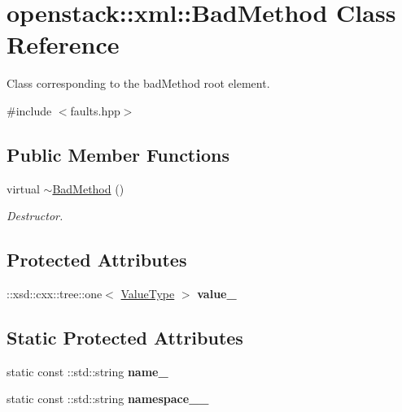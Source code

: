 \hypertarget{classopenstack_1_1xml_1_1BadMethod}{
\section{openstack::xml::BadMethod Class Reference}
\label{classopenstack_1_1xml_1_1BadMethod}
}


Class corresponding to the badMethod root element.  




{\ttfamily \#include $<$faults.hpp$>$}

\subsection*{Public Member Functions}
\begin{DoxyCompactItemize}
\item 
\hypertarget{classopenstack_1_1xml_1_1BadMethod_ad9b4f5e65c544ced775265c748c0f3c0}{
virtual \hyperlink{classopenstack_1_1xml_1_1BadMethod_ad9b4f5e65c544ced775265c748c0f3c0}{$\sim$BadMethod} ()}
\label{classopenstack_1_1xml_1_1BadMethod_ad9b4f5e65c544ced775265c748c0f3c0}

\begin{DoxyCompactList}\small\item\em Destructor. \item\end{DoxyCompactList}\end{DoxyCompactItemize}
\subsection*{Protected Attributes}
\begin{DoxyCompactItemize}
\item 
\hypertarget{classopenstack_1_1xml_1_1BadMethod_ae899fbbfa24c7ef1e0e87e17eacb1ab7}{
::xsd::cxx::tree::one$<$ \hyperlink{classopenstack_1_1xml_1_1BadMethodAPIFault}{ValueType} $>$ {\bfseries value\_\-}}
\label{classopenstack_1_1xml_1_1BadMethod_ae899fbbfa24c7ef1e0e87e17eacb1ab7}

\end{DoxyCompactItemize}
\subsection*{Static Protected Attributes}
\begin{DoxyCompactItemize}
\item 
\hypertarget{classopenstack_1_1xml_1_1BadMethod_ae5cf9cc2125898f8369a4c31bad3b5c0}{
static const ::std::string {\bfseries name\_\-}}
\label{classopenstack_1_1xml_1_1BadMethod_ae5cf9cc2125898f8369a4c31bad3b5c0}

\item 
\hypertarget{classopenstack_1_1xml_1_1BadMethod_a16501c86fabf97dd3b9dec79a66def08}{
static const ::std::string {\bfseries namespace\_\-\_\-}}
\label{classopenstack_1_1xml_1_1BadMethod_a16501c86fabf97dd3b9dec79a66def08}

\end{DoxyCompactItemize}
